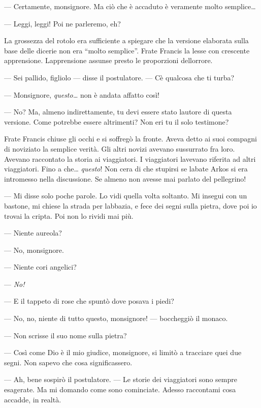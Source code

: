 --- Certamente, monsignore. Ma ciò che è accaduto è veramente molto
semplice\ldots{}

--- Leggi, leggi! Poi ne parleremo, eh?

La grossezza del rotolo era sufficiente a spiegare che la versione
elaborata sulla base delle dicerie non era ``molto semplice''. Frate
Francis la lesse con crescente apprensione.
L\textquotesingle apprensione assunse presto le proporzioni
dell\textquotesingle orrore.

--- Sei pallido, figliolo --- disse il postulatore. ---
C\textquotesingle è qualcosa che ti turba?

--- Monsignore, \emph{questo\ldots{}} non è andata affatto così!

--- No? Ma, almeno indirettamente, tu devi essere stato
l\textquotesingle autore di questa versione. Come potrebbe essere
altrimenti? Non eri tu il solo testimone?

Frate Francis chiuse gli occhi e si soffregò la fronte. Aveva detto ai
suoi compagni di noviziato la semplice verità. Gli altri novizi avevano
sussurrato fra loro. Avevano raccontato la storia ai viaggiatori. I
viaggiatori l\textquotesingle avevano riferita ad altri viaggiatori.
Fino a che\ldots{} \emph{questo}! Non c\textquotesingle era di che
stupirsi se l\textquotesingle abate Arkos si era intromesso nella
discussione. Se almeno non avesse mai parlato del pellegrino!

--- Mi disse solo poche parole. Lo vidi quella volta soltanto. Mi
insegui con un bastone, mi chiese la strada per
l\textquotesingle abbazia, e fece dei segni sulla pietra, dove poi io
trovai la cripta. Poi non lo rividi mai più.

--- Niente aureola?

--- No, monsignore.

--- Niente cori angelici?

--- \emph{No!}

--- E il tappeto di rose che spuntò dove posava i piedi?

--- No, no, niente di tutto questo, monsignore! --- boccheggiò il
monaco.

--- Non scrisse il suo nome sulla pietra?

--- Così come Dio è il mio giudice, monsignore, si limitò a tracciare
quei due segni. Non sapevo che cosa significassero.

--- Ah, bene sospirò il postulatore. --- Le storie dei viaggiatori sono
sempre esagerate. Ma mi domando come sono cominciate. Adesso raccontami
cosa accadde, in realtà.

